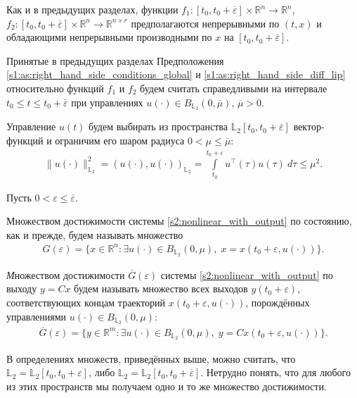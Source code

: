 \documentclass[../main.tex]{subfiles}
\begin{document}
Как и в предыдущих разделах, функции $ f_1: [t_0, t_0 + \overline{\varepsilon}] \times \mathbb{R}^{n} \rightarrow \mathbb{R}^{n} $, $ f_2: [t_0, t_0 + \overline{\varepsilon}] \times \mathbb{R}^{n} \rightarrow \mathbb{R}^{n \times r} $ предполагаются непрерывными по $(t, x)$ и обладающими непрерывными производными по $x$ на $ [t_0, t_0 + \overline{\varepsilon}]$. 

Принятые в предыдущих разделах Предположения \ref{s1:as:right_hand_side_conditions_global} и \ref{s1:as:right_hand_side_diff_lip} относительно функций $f_1$ и $f_2$ будем считать справедливыми на интервале $t_0 \leqslant t \leqslant t_0 + \overline{\varepsilon} $ при управлениях $u(\cdot) \in B_{\mathbb{L}_2}(0, \overline{\mu}) $, $\overline{\mu} > 0$.

 Управление $u(t)$ будем выбирать из
пространства $\mathbb{L}_2[t_0,t_0+\overline{\varepsilon}]$ вектор-функций и ограничим его шаром радиуса $ 0 < \mu \leqslant \overline{\mu} $:
\begin{gather}\label{s2:constrY}
 \lVert u(\cdot)\rVert^2_{\mathbb{L}_2} = \left(u(\cdot),u(\cdot) \right)_{\mathbb{L}_2} = \int\limits_{t_0}^{t_0 + \varepsilon} u^{\top}(\tau) u(\tau) \ d\tau  \leqslant \mu^2.
\end{gather}

Пусть $ 0 < \varepsilon \leqslant \overline{\varepsilon} $. 

Множеством достижимости системы \eqref{s2:nonlinear_with_output} по состоянию, как и прежде, будем называть множество 
\begin{gather*}
 G(\varepsilon)=\{x\in \mathbb{R}^n:\exists u(\cdot)\in B_{\mathbb{L}_2}(0,\mu),\; x=x(t_0+\varepsilon, u(\cdot))\}.
\end{gather*}


\begin{definition}
 {\textit Множеством достижимости $\overline{G}(\varepsilon)$ системы \eqref{s2:nonlinear_with_output} по выходу} $ y = C x $ будем называть множество всех выходов $ y(t_0+\varepsilon) $,
 соответствующих концам траекторий $ x(t_0+\varepsilon, u(\cdot)) $, порождённых управлениями $ u(\cdot) \in B_{\mathbb{L}_2}(0,\mu)$:
 \begin{gather*}
 \overline{G}(\varepsilon)=\{y\in \mathbb{R}^m:\exists u(\cdot)\in B_{\mathbb{L}_2}(0,\mu),\; y=Cx(t_0+\varepsilon, u(\cdot))\}.
 \end{gather*}
\end{definition}

В определениях множеств, приведённых выше, можно считать, что $ \mathbb{L}_2 =\mathbb{L}_2[t_0,t_0+\varepsilon] $, либо $ \mathbb{L}_2=\mathbb{L}_2[t_0,t_0+\overline{\varepsilon}] $.
Нетрудно понять, что для любого из этих пространств мы получаем одно и то же множество достижимости. 
 
\end{document}
